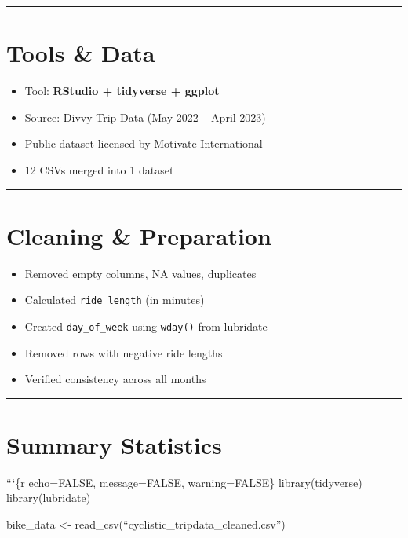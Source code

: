 \documentclass[
]{article}
\providecommand{\tightlist}{%
  \setlength{\itemsep}{0pt}\setlength{\parskip}{0pt}}
\begin{document}
\begin{center}\rule{0.5\linewidth}{0.5pt}\end{center}

\section{Tools \& Data}\label{tools-data}

\begin{itemize}
\tightlist
\item
  Tool: \textbf{RStudio + tidyverse + ggplot}
\item
  Source: Divvy Trip Data (May 2022 -- April 2023)
\item
  Public dataset licensed by Motivate International
\item
  12 CSVs merged into 1 dataset
\end{itemize}

\begin{center}\rule{0.5\linewidth}{0.5pt}\end{center}

\section{Cleaning \& Preparation}\label{cleaning-preparation}

\begin{itemize}
\tightlist
\item
  Removed empty columns, NA values, duplicates
\item
  Calculated \texttt{ride\_length} (in minutes)
\item
  Created \texttt{day\_of\_week} using \texttt{wday()} from lubridate
\item
  Removed rows with negative ride lengths
\item
  Verified consistency across all months
\end{itemize}

\begin{center}\rule{0.5\linewidth}{0.5pt}\end{center}

\section{Summary Statistics}\label{summary-statistics}

```\{r echo=FALSE, message=FALSE, warning=FALSE\} library(tidyverse)
library(lubridate)

bike\_data \textless- read\_csv(``cyclistic\_tripdata\_cleaned.csv'')
\end{document}
